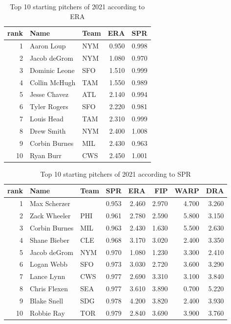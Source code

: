 \documentclass [52pt] {article}
\begin{document}
\begin{table}[h!]
\centering
\begin{tabular}{rllrr}
  \hline
  rank & Name & Team & ERA & SPR \\ 
  \hline
     1 & Aaron Loup & NYM & 0.950 & 0.998 \\ 
      2 & Jacob deGrom & NYM & 1.080 & 0.970 \\ 
      3 & Dominic Leone & SFO & 1.510 & 0.999 \\ 
     4 & Collin McHugh & TAM & 1.550 & 0.989 \\ 
      5 & Jesse Chavez & ATL & 2.140 & 0.994 \\ 
      6 & Tyler Rogers & SFO & 2.220 & 0.981 \\ 
      7 & Louis Head & TAM & 2.310 & 0.999 \\ 
      8 & Drew Smith & NYM & 2.400 & 1.008 \\ 
      9 & Corbin Burnes & MIL & 2.430 & 0.963 \\ 
     10 & Ryan Burr & CWS & 2.450 & 1.001 \\ 
   \hline
\end{tabular}
\caption{Top 10 starting pitchers of 2021 according to ERA}
\label{tab : ERA}
\end{table}

\begin{table}[ht]
\centering
\begin{tabular}{rllrrrrr}
  \hline
 rank & Name & Team & SPR & ERA & FIP & WARP & DRA \\ 
  \hline
  1 & Max Scherzer &  & 0.953 & 2.460 & 2.970 & 4.700 & 3.260 \\ 
  2 & Zack Wheeler & PHI & 0.961 & 2.780 & 2.590 & 5.800 & 3.150 \\ 
  3 & Corbin Burnes & MIL & 0.963 & 2.430 & 1.630 & 5.500 & 2.630 \\ 
  4 & Shane Bieber & CLE & 0.968 & 3.170 & 3.020 & 2.400 & 3.350 \\ 
  5 & Jacob deGrom & NYM & 0.970 & 1.080 & 1.230 & 3.300 & 2.410 \\ 
  6 & Logan Webb & SFO & 0.973 & 3.030 & 2.720 & 3.600 & 3.290 \\ 
  7 & Lance Lynn & CWS & 0.977 & 2.690 & 3.310 & 3.100 & 3.840 \\ 
  8 & Chris Flexen & SEA & 0.977 & 3.610 & 3.890 & 0.700 & 5.220 \\ 
  9 & Blake Snell & SDG & 0.978 & 4.200 & 3.820 & 2.400 & 3.930 \\ 
  10 & Robbie Ray & TOR & 0.979 & 2.840 & 3.690 & 3.900 & 3.760 \\ 
  \hline
\end{tabular}
\caption{Top 10 starting pitchers of 2021 according to SPR}
\label{tab : top10SPR}
\end{table}
\end{document}
